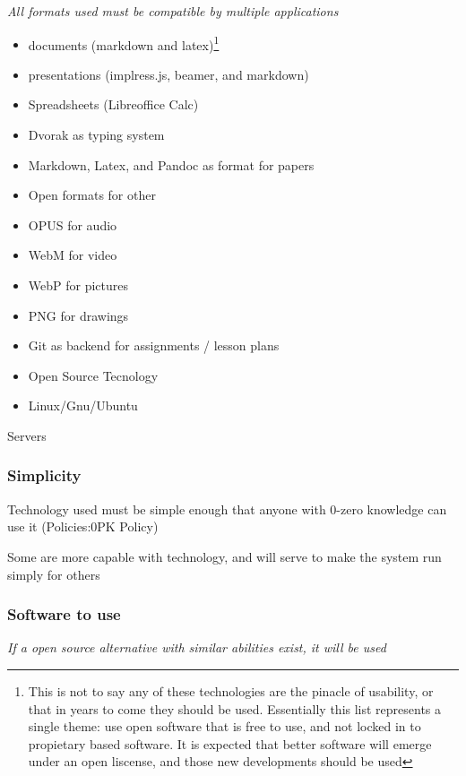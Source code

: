\documentclass[CSHFoundation.tex]{subfiles}
\begin{document}
\emph{All formats used must be compatible by multiple applications}

\begin{itemize}
\item documents (markdown and latex)\footnote{This is not to say any of these technologies are the pinacle of usability, or that in years to come they should be used. Essentially this list represents a single theme: use open software that is free to use, and not locked in to propietary based software. It is expected that better software will emerge under an open liscense, and those new developments should be used}
\item presentations (implress.js, beamer, and markdown)
\item Spreadsheets (Libreoffice Calc)
\item Dvorak as typing system
\item Markdown, Latex, and Pandoc as format for papers
\item Open formats for other
\item OPUS for audio
\item WebM for video
\item WebP for pictures
\item PNG for drawings
\item Git as backend for assignments / lesson plans
\item Open Source Tecnology
\item Linux/Gnu/Ubuntu
\end{itemize}Servers

\subsubsection{Simplicity}

Technology used must be simple enough that anyone with 0-zero knowledge can use it (Policies:0PK Policy)

Some are more capable with technology, and will serve to make the system run simply for others

\subsubsection{Software to use}



\emph{If a open source alternative with similar abilities exist, it will be used}
\end{document}
